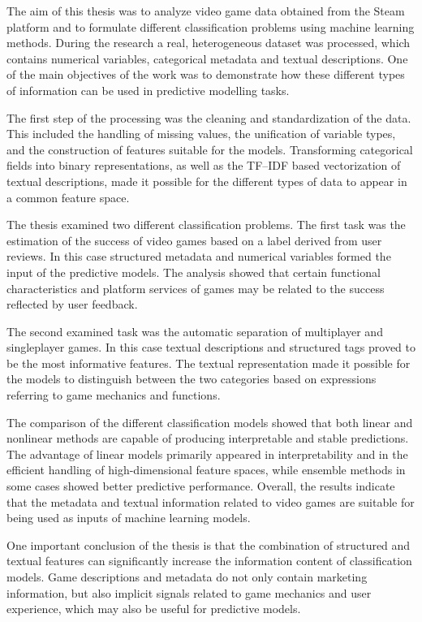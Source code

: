 
The aim of this thesis was to analyze video game data obtained from the Steam \cite{steam} platform and to formulate different classification problems using machine learning methods.
During the research a real, heterogeneous dataset was processed, which contains numerical variables, categorical metadata and textual descriptions.
One of the main objectives of the work was to demonstrate how these different types of information can be used in predictive modelling tasks.

The first step of the processing was the cleaning and standardization of the data.
This included the handling of missing values, the unification of variable types,
and the construction of features suitable for the models.
Transforming categorical fields into binary representations,
as well as the TF--IDF based vectorization of textual descriptions,
made it possible for the different types of data to appear in a common feature space.

The thesis examined two different classification problems.
The first task was the estimation of the success of video games
based on a label derived from user reviews.
In this case structured metadata and numerical variables formed the input of the predictive models.
The analysis showed that certain functional characteristics and platform services of games
may be related to the success reflected by user feedback.

The second examined task was the automatic separation of multiplayer and singleplayer games.
In this case textual descriptions and structured tags proved to be the most informative features.
The textual representation made it possible for the models
to distinguish between the two categories
based on expressions referring to game mechanics and functions.

The comparison of the different classification models showed
that both linear and nonlinear methods are capable of producing interpretable and stable predictions.
The advantage of linear models primarily appeared in interpretability
and in the efficient handling of high-dimensional feature spaces,
while ensemble methods in some cases showed better predictive performance.
Overall, the results indicate that the metadata
and textual information related to video games
are suitable for being used as inputs of machine learning models.

One important conclusion of the thesis is
that the combination of structured and textual features
can significantly increase the information content of classification models.
Game descriptions and metadata do not only contain marketing information,
but also implicit signals related to game mechanics and user experience,
which may also be useful for predictive models.

